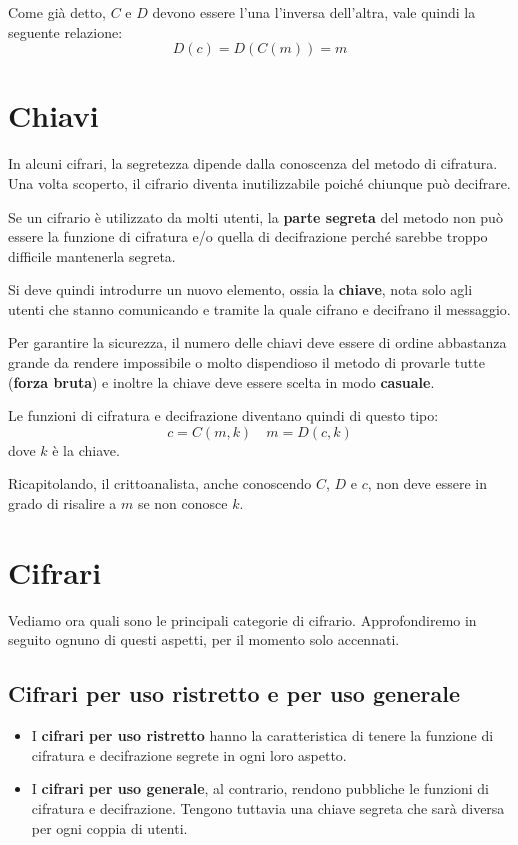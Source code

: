 Come gi\`a detto, $C$ e $D$ devono essere l'una l'inversa dell'altra, vale quindi la seguente relazione:
\[ D(c) = D(C(m)) = m \]

\section{Chiavi}\label{chiavi}
In alcuni cifrari, la segretezza dipende dalla conoscenza del metodo di cifratura. Una volta scoperto, il cifrario
diventa inutilizzabile poich\'e chiunque pu\`o decifrare.

Se un cifrario \`e utilizzato da molti utenti, la \textbf{parte segreta} del metodo non pu\`o essere la funzione di
cifratura e/o quella di decifrazione perch\'e sarebbe troppo difficile mantenerla segreta.

Si deve quindi introdurre un nuovo elemento, ossia la \textbf{chiave}, nota solo agli utenti che stanno comunicando e
tramite la quale cifrano e decifrano il messaggio.

Per garantire la sicurezza, il numero delle chiavi deve essere di ordine abbastanza grande da rendere impossibile o
molto dispendioso il metodo di provarle tutte (\textbf{forza bruta}) e inoltre la chiave deve essere scelta in modo
\textbf{casuale}.

Le funzioni di cifratura e decifrazione diventano quindi di questo tipo:
\[ c = C(m, k) \quad m = D(c, k) \]
dove $k$ \`e la chiave.

Ricapitolando, il crittoanalista, anche conoscendo $C$, $D$ e $c$, non deve essere in grado di risalire a $m$ se non
conosce $k$.

\section{Cifrari}\label{cifrari}
Vediamo ora quali sono le principali categorie di cifrario. Approfondiremo in seguito ognuno di questi aspetti,
per il momento solo accennati.

\subsection{Cifrari per uso ristretto e per uso generale}
\begin{itemize}
	\item I \textbf{cifrari per uso ristretto} hanno la caratteristica di tenere la funzione di cifratura e
	      decifrazione segrete in ogni loro aspetto.
	\item I \textbf{cifrari per uso generale}, al contrario, rendono pubbliche le funzioni di cifratura e decifrazione.
	      Tengono tuttavia una chiave segreta che sar\`a diversa per ogni coppia di utenti.
\end{itemize}

